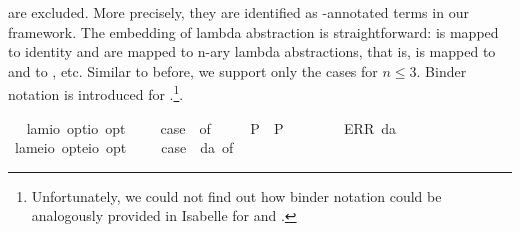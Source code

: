 \begin{isabellebody}
\begin{isamarkuptext}
  are excluded. More precisely, they are identified as -annotated 
  terms in our framework.
  The embedding of lambda abstraction is 
  straightforward:  is mapped to identity and  are mapped to n-ary
  lambda abstractions, that is,  is mapped to  and  
  to , etc.
  Similar to before, we support only the cases for $n\leq 3$. Binder notation is
  introduced for \isa{\isactrlbold {\isasymlambda}}.\footnote{Unfortunately, we could not find out how binder notation
  could be analogously provided in Isabelle for  and .}.%
\end{isamarkuptext}\isamarkuptrue%
\ \isamarkupfalse%
\ lam{}{\isacharcolon}{\isacharcolon}{\isachardoublequoteopen}io\ opt{\isasymRightarrow}io\ opt{\isachardoublequoteclose}\ {\isacharparenleft}{\isachardoublequoteopen}\isactrlbold {\isasymlambda}\ \ {\isachardoublequoteopen}\isactrlbold {\isasymlambda}\ {\isasymequiv}\ case\ {\isasymphi}\ of\ \isanewline
\ \ \ \ P{\isacharparenleft}{\isasympsi}{\isacharparenright}\ {\isasymRightarrow}\ P{\isacharparenleft}{\isasympsi}{\isacharparenright}\ {\isacharbar}\ \isanewline
\ \ \ \ {\isacharunderscore}\ {\isasymRightarrow}\ ERR\ da{\isachardoublequoteclose}\ \ \isanewline
\ \isamarkupfalse%
\ lam{\isacharcolon}{\isacharcolon}{\isachardoublequoteopen}{\isacharparenleft}e{\isasymRightarrow}io\ opt{\isacharparenright}{\isasymRightarrow}{\isacharparenleft}e{\isasymRightarrow}io{\isacharparenright}\ opt{\isachardoublequoteclose}\ {\isacharparenleft}{\isachardoublequoteopen}\isactrlbold {\isasymlambda}{\isachardoublequoteclose}{\isacharparenright}\ \ {\isachardoublequoteopen}\isactrlbold {\isasymlambda}{\isasymPhi}\ {\isasymequiv}\ case\ {\isacharparenleft}{\isasymPhi}\ da{\isacharparenright}\ of\isanewline

\end{isabellebody}
